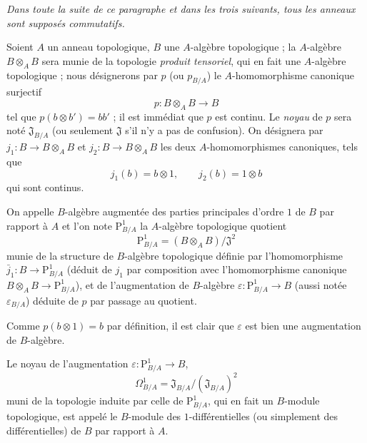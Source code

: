 \textit{Dans toute la suite de ce paragraphe et dans les trois suivants, tous les
anneaux sont supposés commutatifs.}

\begin{env}[20.4.1]
\label{0.20.4.1-fr}
Soient $A$ un anneau topologique, $B$ une $A$-algèbre topologique ; la
$A$-algèbre $B\otimes_A B$ sera munie de la topologie \emph{produit
tensoriel}, qui en fait une $A$-algèbre topologique ; nous désignerons par $p$
(ou $p_{B/A}$) le $A$-homomorphisme canonique surjectif
\begin{equation}
\tag{20.4.1.1}
\label{0.20.4.1.1-fr}
  p:B\otimes_A B\to B
\end{equation}
tel que $p(b\otimes b')=bb'$ ; il est immédiat que $p$ est continu. Le
\emph{noyau} de $p$ sera noté $\mathfrak{J}_{B/A}$ (ou seulement
$\mathfrak{J}$ s'il n'y a pas de confusion). On désignera par
$j_1:B\to B\otimes_A B$ et $j_2:B\to B\otimes_A B$ les deux
$A$-homomorphismes canoniques, tels que
\[
  j_1(b)=b\otimes1, \qquad j_2(b)=1\otimes b
\]
qui sont continus.
\end{env}

\begin{definition}[20.4.2]
\label{0.20.4.2-fr}
On appelle $B$-algèbre augmentée des parties principales d'ordre $1$ de
$B$ par rapport à $A$ et l'on note $\mathrm{P}^1_{B/A}$ la $A$-algèbre
topologique quotient
\begin{equation}
\tag{20.4.2.1}
\label{0.20.4.2.1-fr}
  \mathrm{P}^1_{B/A}=(B\otimes_A B)/\mathfrak{J}^2
\end{equation}
munie de la structure de $B$-algèbre topologique définie par l'homomorphisme
$\bar{j}_1:B\to\mathrm{P}^1_{B/A}$ (déduit de $j_1$ par composition avec
l'homomorphisme canonique $B\otimes_A B\to\mathrm{P}^1_{B/A}$), et de
l'augmentation de $B$-algèbre $\varepsilon:\mathrm{P}^1_{B/A}\to B$ (aussi
notée $\varepsilon_{B/A}$) déduite de $p$ par passage au quotient.
\end{definition}

Comme $p(b\otimes1)=b$ par définition, il est clair que $\varepsilon$ est
bien une augmentation de $B$-algèbre.

\begin{definition}[20.4.3]
\label{0.20.4.3-fr}
Le noyau de l'augmentation $\varepsilon:\mathrm{P}^1_{B/A}\to B$,
\begin{equation}
\tag{20.4.3.1}
\label{0.20.4.3.1-fr}
  \Omega^1_{B/A}=\mathfrak{J}_{B/A}/(\mathfrak{J}_{B/A})^2
\end{equation}
muni de la topologie induite par celle de $\mathrm{P}^1_{B/A}$, qui en fait
un $B$-module topologique, est appelé le $B$-module des
$1$-différentielles \textup{(ou simplement des} différentielles) de $B$
par rapport à $A$.
\end{definition}

